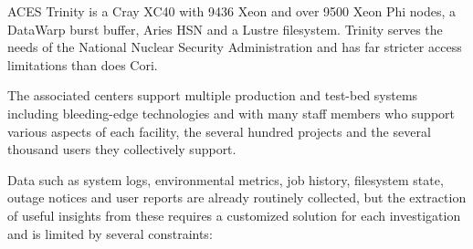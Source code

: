 ACES Trinity is a Cray XC40
with 9436 Xeon and over 9500 Xeon Phi nodes, a DataWarp burst buffer, Aries HSN
and a Lustre filesystem. Trinity serves the needs of the National Nuclear 
Security Administration and has far stricter access limitations than does Cori.

The associated centers support multiple production and test-bed systems including 
bleeding-edge technologies and with many staff members who support 
various aspects of each facility, the several hundred projects and the several 
thousand users they collectively support.

Data such as system logs, environmental metrics, job history, filesystem state,
outage notices and user reports are already routinely collected, but the 
extraction of useful insights from these requires a customized solution for 
each investigation and is limited by several constraints:

